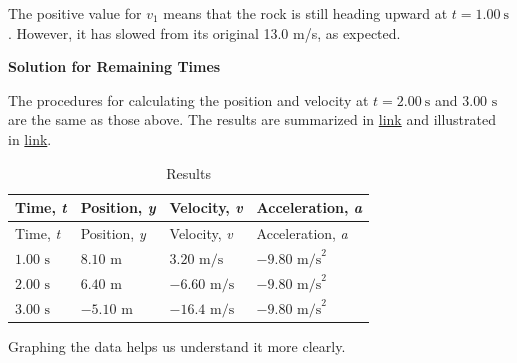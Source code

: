 \documentclass[
]{book}
\begin{document}
The positive value for \(v_{1}{}\) means that the rock is still heading
upward at \({{t = 1}\text{.}\text{00}\ \text{s}}{}\). However, it has
slowed from its original 13.0\emph{} m/s, as
expected.

\textbf{Solution for Remaining Times}

The procedures for calculating the position and velocity at
\({{t = 2}\text{.}\text{00}\ \text{s}}{}\) and \({3\text{.}\text{00\ s}}{}\)
are the same as those above. The results are summarized in
\protect\hyperlink{eip-304}{link} and illustrated in
\protect\hyperlink{import-auto-id4064055}{link}.

\begin{longtable}[]{@{}llll@{}}
\caption{{Results}}\tabularnewline
\toprule
Time, \emph{t} & Position, \emph{y} & Velocity, \emph{v} & Acceleration, \emph{a}\tabularnewline
\midrule
\endfirsthead
\toprule
Time, \emph{t} & Position, \emph{y} & Velocity, \emph{v} & Acceleration, \emph{a}\tabularnewline
\midrule
\endhead
\({1\text{.}\text{00\ s}}{}\) & \({8\text{.}\text{10\ m}}{}\) & \({3\text{.}\text{20\ m/s}}{}\) & \({{- 9}\text{.}\text{80\ m/s}^{2}}{}\)\tabularnewline
\({2\text{.}\text{00\ s}}{}\) & \({6\text{.}\text{40\ m}}{}\) & \({{- 6}\text{.}\text{60\ m/s}}{}\) & \({{- 9}\text{.}\text{80\ m/s}^{2}}{}\)\tabularnewline
\({3\text{.}\text{00\ s}}{}\) & \({{- 5}\text{.}\text{10\ m}}{}\) & \({{- \text{16}}\text{.}\text{4\ m/s}}{}\) & \({{- 9}\text{.}\text{80\ m/s}^{2}}{}\)\tabularnewline
\bottomrule
\end{longtable}

Graphing the data helps us understand it more clearly.
\end{document}
